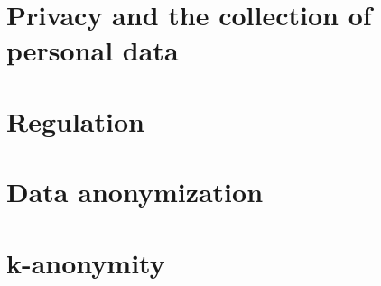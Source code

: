 \section{Privacy and the collection of personal data}\label{sec:privacy-and-the-collection-of-personal-data}


\section{Regulation}\label{sec:regulation}


\section{Data anonymization}\label{sec:data-anonymization}


\section{k-anonymity}\label{sec:k-anonymity}
